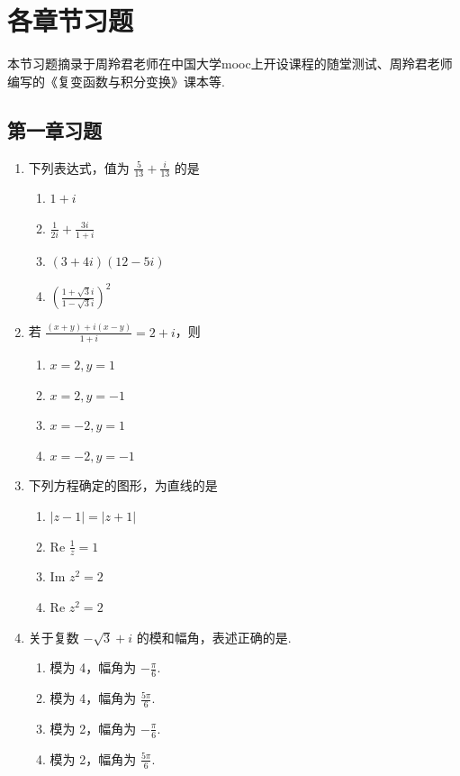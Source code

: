\documentclass[openany,oneside]{ctexbook}
\begin{document}
\chapter{各章节习题}
本节习题摘录于周羚君老师在中国大学mooc上开设课程的随堂测试、周羚君老师编写的《复变函数与积分变换》课本等.
\section{第一章习题}
\begin{enumerate}
\item 
下列表达式，值为 \(\frac{5}{13} + \frac{i}{13}\) 的是

\begin{enumerate}[label=\Alph*.]
\item \(1 + i\)    
\item \(\frac{1}{2i} + \frac{3i}{1+i}\)  
\item \((3 + 4i)(12 - 5i)\)  
\item \(\left(\frac{1 + \sqrt{3}i}{1 - \sqrt{3}i}\right)^2\)  
\end{enumerate}

\item 
若 \(\frac{(x + y) + i(x - y)}{1 + i} = 2 + i\)，则  

\begin{enumerate}[label=\Alph*.]
\item \(x = 2, y = 1\)  
\item \(x = 2, y = -1\)  
\item \(x = -2, y = 1\)  
\item \(x = -2, y = -1\)  
\end{enumerate}

\item  
下列方程确定的图形，为直线的是

\begin{enumerate}[label=\Alph*.]
\item \(|z - 1| = |z + 1|\)  
\item \(\text{Re } \frac{1}{z} = 1\)  
\item \(\text{Im } z^2 = 2\)  
\item \(\text{Re } z^2 = 2\)  
\end{enumerate}

\item 
关于复数 \(-\sqrt{3} + i\) 的模和幅角，表述正确的是. 

\begin{enumerate}[label=\Alph*.]
\item 模为 4，幅角为 \(-\frac{\pi}{6}\).
\item 模为 4，幅角为 \(\frac{5\pi}{6}\).
\item 模为 2，幅角为 \(-\frac{\pi}{6}\).
\item 模为 2，幅角为 \(\frac{5\pi}{6}\).
\end{enumerate}


\end{enumerate}
\end{document}
